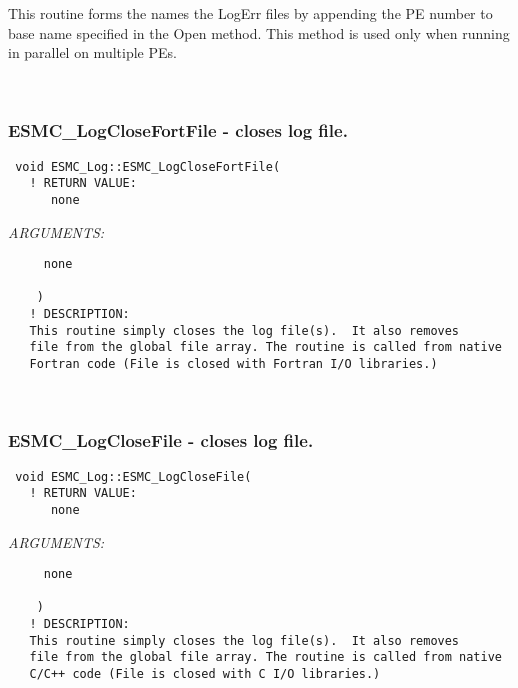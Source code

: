    This routine forms the names the LogErr files by appending the
   PE number to base name specified in the Open method.  This method
   is used only when running in parallel on multiple PEs.
   
 
\mbox{}\hrulefill\ 
 
\subsubsection [ESMC\_LogCloseFortFile] {ESMC\_LogCloseFortFile - closes log file. }


  
\begin{verbatim} void ESMC_Log::ESMC_LogCloseFortFile(
   ! RETURN VALUE:
      none\end{verbatim}{\em ARGUMENTS:}
\begin{verbatim}     none
 
    )
   ! DESCRIPTION:
   This routine simply closes the log file(s).  It also removes
   file from the global file array. The routine is called from native
   Fortran code (File is closed with Fortran I/O libraries.)\end{verbatim}
 
 
\mbox{}\hrulefill\ 
 
\subsubsection [ESMC\_LogCloseFile] {ESMC\_LogCloseFile - closes log file. }


  
\begin{verbatim} void ESMC_Log::ESMC_LogCloseFile(
   ! RETURN VALUE:
      none\end{verbatim}{\em ARGUMENTS:}
\begin{verbatim}     none
 
    )
   ! DESCRIPTION:
   This routine simply closes the log file(s).  It also removes
   file from the global file array. The routine is called from native
   C/C++ code (File is closed with C I/O libraries.)\end{verbatim}
 
 
